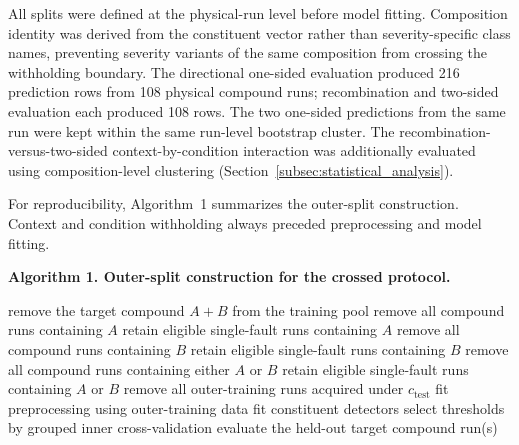 \documentclass{ieeeaccess}
\begin{document}
All splits were defined at the physical-run level before model fitting.
Composition identity was derived from the constituent vector rather than
severity-specific class names, preventing severity variants of the same
composition from crossing the withholding boundary. The directional
one-sided evaluation produced 216 prediction rows from 108 physical compound
runs; recombination and two-sided evaluation each produced 108 rows. The two
one-sided predictions from the same run were kept within the same run-level
bootstrap cluster. The recombination-versus-two-sided context-by-condition
interaction was additionally evaluated using composition-level clustering
(Section~\ref{subsec:statistical_analysis}).

For reproducibility, Algorithm~1 summarizes the outer-split construction.
Context and condition withholding always preceded preprocessing and model
fitting.

\noindent\textbf{Algorithm 1. Outer-split construction for the crossed protocol.}
\begin{algorithmic}[1]
            \State remove the target compound $A+B$ from the training pool
            \State remove all compound runs containing $A$
            \State retain eligible single-fault runs containing $A$
            \State remove all compound runs containing $B$
            \State retain eligible single-fault runs containing $B$
            \State remove all compound runs containing either $A$ or $B$
            \State retain eligible single-fault runs containing $A$ or $B$
        \EndIf
                \State remove all outer-training runs acquired under
                $c_{\mathrm{test}}$
            \EndIf
            \State fit preprocessing using outer-training data
            \State fit constituent detectors
            \State select thresholds by grouped inner cross-validation
            \State evaluate the held-out target compound run(s)
        \EndFor
    \EndFor
\EndFor
\end{algorithmic}
\end{document}
